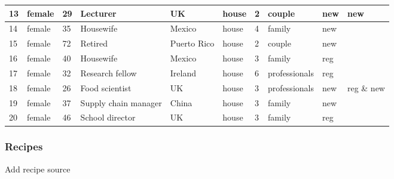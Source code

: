 \documentclass[]{article}
\begin{document}
\begin{table}
\begin{tabular}[t]{l|l|l|l|l|l|l|l|l|l}
\hline
\rowcolor{gray!6}  13 & female & 29 & Lecturer & UK & house & 2 & couple & new & new\\
\hline
14 & female & 35 & Housewife & Mexico & house & 4 & family & new & \\
\hline
\rowcolor{gray!6}  15 & female & 72 & Retired & Puerto Rico & house & 2 & couple & new & \\
\hline
16 & female & 40 & Housewife & Mexico & house & 3 & family & reg & \\
\hline
\rowcolor{gray!6}  17 & female & 32 & Research fellow & Ireland & house & 6 & professionals & reg & \\
\hline
18 & female & 26 & Food scientist & UK & house & 3 & professionals & new & reg \& new\\
\hline
\rowcolor{gray!6}  19 & female & 37 & Supply chain manager & China & house & 3 & family & new & \\
\hline
20 & female & 46 & School director & UK & house & 3 & family & reg & \\
\hline
\end{tabular}
\end{table}

\subsubsection{Recipes}\label{recipes}

Add recipe source
\end{document}
